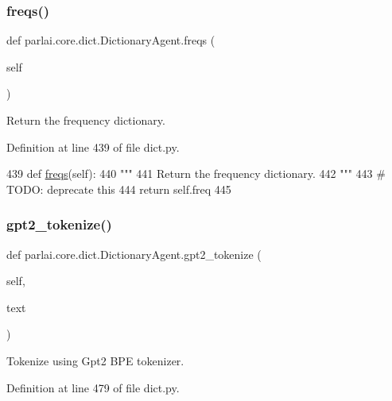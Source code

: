 \subsubsection{\texorpdfstring{freqs()}{freqs()}}
{\footnotesize\ttfamily def parlai.\+core.\+dict.\+Dictionary\+Agent.\+freqs (\begin{DoxyParamCaption}\item[{}]{self }\end{DoxyParamCaption})}

\begin{DoxyVerb}Return the frequency dictionary.
\end{DoxyVerb}
 

Definition at line 439 of file dict.\+py.


\begin{DoxyCode}
439     \textcolor{keyword}{def }\hyperlink{namespaceparlai_1_1agents_1_1tfidf__retriever_1_1build__tfidf_abb3607652abdd76d57a6ae90e19e3828}{freqs}(self):
440         \textcolor{stringliteral}{"""}
441 \textcolor{stringliteral}{        Return the frequency dictionary.}
442 \textcolor{stringliteral}{        """}
443         \textcolor{comment}{# TODO: deprecate this}
444         \textcolor{keywordflow}{return} self.freq
445 
\end{DoxyCode}
\mbox{\label{classparlai_1_1core_1_1dict_1_1DictionaryAgent_a57685af2fcd0a684b7102c55afe0c8ad}} 
\subsubsection{\texorpdfstring{gpt2\+\_\+tokenize()}{gpt2\_tokenize()}}
{\footnotesize\ttfamily def parlai.\+core.\+dict.\+Dictionary\+Agent.\+gpt2\+\_\+tokenize (\begin{DoxyParamCaption}\item[{}]{self,  }\item[{}]{text }\end{DoxyParamCaption})}

\begin{DoxyVerb}Tokenize using Gpt2 BPE tokenizer.
\end{DoxyVerb}
 

Definition at line 479 of file dict.\+py.


